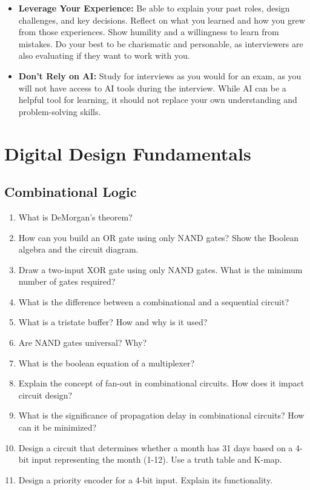 \documentclass[11pt]{article}
\begin{document}
\begin{itemize}
    \item \textbf{Leverage Your Experience:} Be able to explain your past
    roles, design challenges, and key decisions. Reflect on what you learned
    and how you grew from those experiences. Show humility and a willingness to
    learn from mistakes. Do your best to be charismatic and personable, as
    interviewers are also evaluating if they want to work with you.

    \item \textbf{Don't Rely on AI:} Study for interviews as you would for an
    exam, as you will not have access to AI tools during the interview. While
    AI can be a helpful tool for learning, it should not replace your own
    understanding and problem-solving skills.
\end{itemize}

\section{Digital Design Fundamentals}

\subsection{Combinational Logic}
\begin{enumerate}
    \item What is DeMorgan's theorem?
    \item How can you build an OR gate using only NAND gates? Show the Boolean
    algebra and the circuit diagram.
    \item Draw a two-input XOR gate using only NAND gates. What is the minimum
    number of gates required?
    \item What is the difference between a combinational and a sequential
    circuit?
    \item What is a tristate buffer? How and why is it used?
    \item Are NAND gates universal? Why?
    \item What is the boolean equation of a multiplexer?
    \item Explain the concept of fan-out in combinational circuits. How does it
    impact circuit design?
    \item What is the significance of propagation delay in combinational
    circuits? How can it be minimized?
    \item Design a circuit that determines whether a month has 31 days based on
    a 4-bit input representing the month (1-12). Use a truth table and K-map.
    \item Design a priority encoder for a 4-bit input. Explain its
    functionality.
\end{enumerate}
\end{document}
